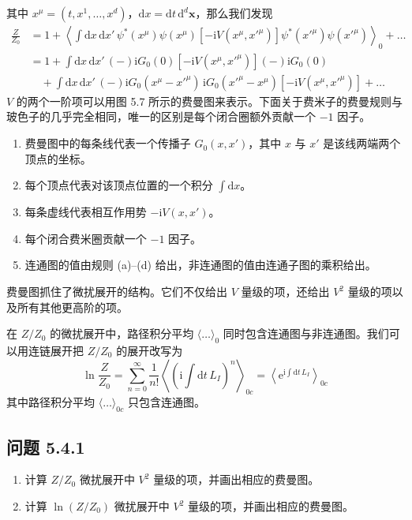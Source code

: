 
其中 $x^{\mu}=(t,x^{1},\dots,x^{d})$，$\mathrm{d}x=\mathrm{d}t\,\mathrm{d}^{d}\pmb{x}$，那么我们发现
\begin{align*}
\frac{Z}{Z_{0}} &= 1+\left\langle \int \mathrm{d}x\,\mathrm{d}x'\,\psi^{*}(x^{\mu})\psi(x^{\mu})[-\mathrm{i}V(x^{\mu},x'^{\mu})]\psi^{*}(x'^{\mu})\psi(x'^{\mu})\right\rangle_{0}+\dots\\
&=1+\int \mathrm{d}x\,\mathrm{d}x'\,(-)\mathrm{i}G_{0}(0)[-\mathrm{i}V(x^{\mu},x'^{\mu})](-)\mathrm{i}G_{0}(0)\\
&\quad +\int \mathrm{d}x\,\mathrm{d}x'\,(-)\mathrm{i}G_{0}(x^{\mu}-x'^{\mu})\,\mathrm{i}G_{0}(x'^{\mu}-x^{\mu})[-\mathrm{i}V(x^{\mu},x'^{\mu})]+\dots
\end{align*}
$V$ 的两个一阶项可以用图 5.7 所示的费曼图来表示。下面关于费米子的费曼规则与玻色子的几乎完全相同，唯一的区别是每个闭合圈额外贡献一个 $-1$ 因子。
\begin{enumerate}
\item[(a)] 费曼图中的每条线代表一个传播子 $G_{0}(x,x')$，其中 $x$ 与 $x'$ 是该线两端两个顶点的坐标。
\item[(b)] 每个顶点代表对该顶点位置的一个积分 $\int \mathrm{d}x$。
\item[(c)] 每条虚线代表相互作用势 $-\mathrm{i}V(x,x')$。
\item[(d)] 每个闭合费米圈贡献一个 $-1$ 因子。
\item[(e)] 连通图的值由规则 (a)--(d) 给出，非连通图的值由连通子图的乘积给出。
\end{enumerate}
费曼图抓住了微扰展开的结构。它们不仅给出 $V$ 量级的项，还给出 $V^{2}$ 量级的项以及所有其他更高阶的项。

在 $Z/Z_{0}$ 的微扰展开中，路径积分平均 $\langle\dots\rangle_{0}$ 同时包含连通图与非连通图。我们可以用连链展开把 $Z/Z_{0}$ 的展开改写为
\begin{equation*}
\ln\frac{Z}{Z_{0}}=\sum_{n=0}^{\infty}\frac{1}{n!}\left\langle \left(\mathrm{i}\int \mathrm{d}t\,L_{I}\right)^{n}\right\rangle_{0c}=\left\langle \mathrm{e}^{\mathrm{i}\int \mathrm{d}t\,L_{I}}\right\rangle_{0c} \tag{5.4.2}
\end{equation*}
其中路径积分平均 $\langle\dots\rangle_{0c}$ 只包含连通图。

\subsection*{问题 5.4.1}

\begin{enumerate}
\item[(a)] 计算 $Z/Z_{0}$ 微扰展开中 $V^{2}$ 量级的项，并画出相应的费曼图。
\item[(b)] 计算 $\ln(Z/Z_{0})$ 微扰展开中 $V^{2}$ 量级的项，并画出相应的费曼图。
\end{enumerate}

